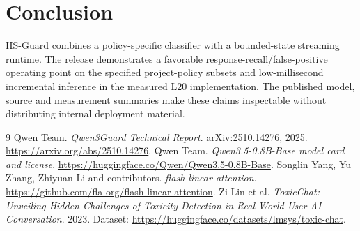 \documentclass[11pt]{article}
\begin{document}
\section{Conclusion}
HS-Guard combines a policy-specific classifier with a bounded-state streaming runtime. The release demonstrates a favorable response-recall/false-positive operating point on the specified project-policy subsets and low-millisecond incremental inference in the measured L20 implementation. The published model, source and measurement summaries make these claims inspectable without distributing internal deployment material.

\begin{thebibliography}{9}
 Qwen Team. \emph{Qwen3Guard Technical Report}. arXiv:2510.14276, 2025. \url{https://arxiv.org/abs/2510.14276}.
 Qwen Team. \emph{Qwen3.5-0.8B-Base model card and license}. \url{https://huggingface.co/Qwen/Qwen3.5-0.8B-Base}.
 Songlin Yang, Yu Zhang, Zhiyuan Li and contributors. \emph{flash-linear-attention}. \url{https://github.com/fla-org/flash-linear-attention}.
 Zi Lin et al. \emph{ToxicChat: Unveiling Hidden Challenges of Toxicity Detection in Real-World User-AI Conversation}. 2023. Dataset: \url{https://huggingface.co/datasets/lmsys/toxic-chat}.
\end{thebibliography}
\end{document}
